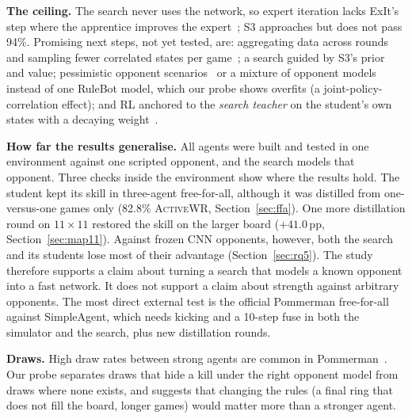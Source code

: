 \documentclass[conference]{IEEEtran}
\newcommand{\awr}{\textsc{ActiveWR}}
\newcommand{\pp}{\,pp}
\begin{document}
\textbf{The ceiling.} The search never uses the network, so expert iteration lacks ExIt's step where the apprentice improves the expert~\cite{anthony2017exit,silver2017agz}; S3 approaches but does not pass 94\%. Promising next steps, not yet tested, are: aggregating data across rounds and sampling fewer correlated states per game~\cite{anthony2017exit,ross2011dagger}; a search guided by S3's prior and value; pessimistic opponent scenarios~\cite{osogami2019} or a mixture of opponent models~\cite{lanctot2017psro} instead of one RuleBot model, which our probe shows overfits (a joint-policy-correlation effect); and RL anchored to the \emph{search teacher} on the student's own states with a decaying weight~\cite{schmitt2018kickstart}.

\textbf{How far the results generalise.} All agents were built and tested in one environment against one scripted opponent, and the search models that opponent. Three checks inside the environment show where the results hold. The student kept its skill in three-agent free-for-all, although it was distilled from one-versus-one games only (82.8\% \awr{}, Section~\ref{sec:ffa}). One more distillation round on $11\times11$ restored the skill on the larger board ($+41.0$\pp{}, Section~\ref{sec:map11}). Against frozen CNN opponents, however, both the search and its students lose most of their advantage (Section~\ref{sec:rq5}). The study therefore supports a claim about turning a search that models a known opponent into a fast network. It does not support a claim about strength against arbitrary opponents. The most direct external test is the official Pommerman free-for-all against SimpleAgent, which needs kicking and a 10-step fuse in both the simulator and the search, plus new distillation rounds.

\textbf{Draws.} High draw rates between strong agents are common in Pommerman~\cite{osogami2019,perezliebana2019,gao2019skynet}. Our probe separates draws that hide a kill under the right opponent model from draws where none exists, and suggests that changing the rules (a final ring that does not fill the board, longer games) would matter more than a stronger agent.
\end{document}
